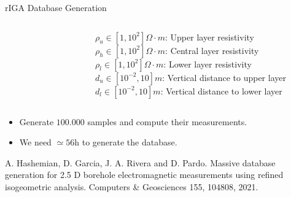 \begin{frame}[t]{rIGA Database Generation}
\begin{columns}
    \begin{column}{0.35\textwidth}
    \begin{figure}[!h]
	\centering
	
	\label{fig:param}
	\end{figure}
    \end{column}
    \begin{column}{0.5\textwidth}
        {\footnotesize $\rho_u \in [1,10^2] \Omega \cdot m$: Upper layer resistivity}\\
        \vspace{0.3cm}
        {\footnotesize $\rho_h \in [1,10^2] \Omega \cdot m$: Central layer resistivity}\\
        \vspace{0.3cm}
        {\footnotesize $\rho_l \in [1,10^2] \Omega \cdot m$: Lower layer resistivity}\\
        \vspace{0.3cm}
        {\footnotesize $d_u \in [10^{-2},10] m$: Vertical distance to upper layer}\\
        \vspace{0.3cm}
        {\footnotesize $d_l \in [10^{-2},10] m$: Vertical distance to lower layer}
    \end{column}
\end{columns}
\vspace{0.2cm}

\begin{itemize}
\item Generate $100.000$ samples and compute their measurements.
\vspace{0.2cm}
\item We need $\simeq 56$h to generate the database.
\end{itemize}

\begin{thebibliography}{2}
 A. Hashemian, D. Garcia, J. A. Rivera and D. Pardo. Massive database generation for 2.5 D borehole electromagnetic measurements using refined isogeometric analysis. Computers \& Geosciences 155, 104808, 2021.
\end{thebibliography}
\end{frame}


%
%




